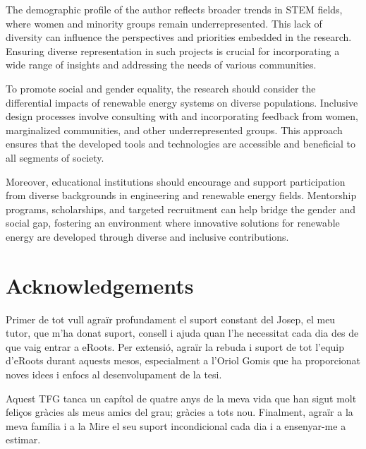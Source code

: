 \documentclass[a4paper,11pt, titlepage, twoside]{article}
\begin{document}
The demographic profile of the author reflects broader trends in STEM fields, where women and minority groups remain underrepresented. This lack of diversity can influence the perspectives and priorities embedded in the research. Ensuring diverse representation in such projects is crucial for incorporating a wide range of insights and addressing the needs of various communities.

To promote social and gender equality, the research should consider the differential impacts of renewable energy systems on diverse populations. Inclusive design processes involve consulting with and incorporating feedback from women, marginalized communities, and other underrepresented groups. This approach ensures that the developed tools and technologies are accessible and beneficial to all segments of society.

Moreover, educational institutions should encourage and support participation from diverse backgrounds in engineering and renewable energy fields. Mentorship programs, scholarships, and targeted recruitment can help bridge the gender and social gap, fostering an environment where innovative solutions for renewable energy are developed through diverse and inclusive contributions.


\section*{Acknowledgements}

Primer de tot vull agraïr profundament el suport constant del Josep, el meu tutor, que m'ha donat suport, consell i ajuda quan
l'he necessitat cada dia des de que vaig entrar a eRoots. Per extensió, agraïr la rebuda i suport de tot l'equip d'eRoots durant aquests mesos,
especialment a l'Oriol Gomis que ha proporcionat noves idees i enfocs al desenvolupament de la tesi.\par

Aquest TFG tanca un capítol de quatre anys de la meva vida que han sigut molt feliços gràcies als meus amics del grau; gràcies a tots nou. 
Finalment, agraïr a la meva família i a la Mire el seu suport incondicional cada dia i a ensenyar-me a estimar.
 
\end{document}
